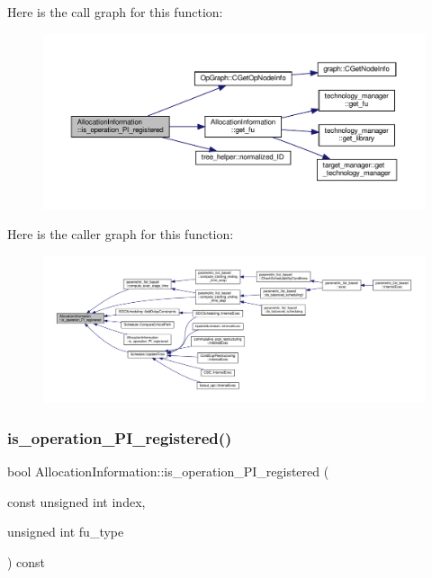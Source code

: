 Here is the call graph for this function\+:
\nopagebreak
\begin{figure}[H]
\begin{center}
\leavevmode
\includegraphics[width=350pt]{d7/d79/classAllocationInformation_a669fe3fcd55c57ac188cb0651a4117c0_cgraph}
\end{center}
\end{figure}
Here is the caller graph for this function\+:
\nopagebreak
\begin{figure}[H]
\begin{center}
\leavevmode
\includegraphics[width=350pt]{d7/d79/classAllocationInformation_a669fe3fcd55c57ac188cb0651a4117c0_icgraph}
\end{center}
\end{figure}
\mbox{\label{classAllocationInformation_a2e448da646b4b29ad72f75c75fdf04b2}} 
\subsubsection{\texorpdfstring{is\+\_\+operation\+\_\+\+P\+I\+\_\+registered()}{is\_operation\_PI\_registered()}\hspace{0.1cm}{\footnotesize\ttfamily [2/3]}}
{\footnotesize\ttfamily bool Allocation\+Information\+::is\+\_\+operation\+\_\+\+P\+I\+\_\+registered (\begin{DoxyParamCaption}\item[{const unsigned int}]{index,  }\item[{unsigned int}]{fu\+\_\+type }\end{DoxyParamCaption}) const}



